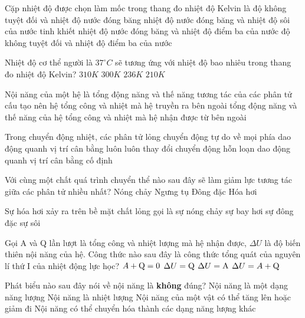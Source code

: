 \begin{ex}
Cặp nhiệt độ được chọn làm mốc trong thang đo nhiệt độ Kelvin là
\choice
{độ không tuyệt đối và nhiệt độ nước đóng băng}
{nhiệt độ nước đóng băng và nhiệt độ sôi của nước tinh khiết}
{nhiệt độ nước đóng băng và nhiệt độ điểm ba của nước}
{\True độ không tuyệt đối và nhiệt độ điểm ba của nước}
\loigiai{}
\end{ex}
\begin{ex}
Nhiệt độ cơ thể người là $37^\circ C$ sẽ tương ứng với nhiệt độ bao nhiêu trong thang đo nhiệt độ Kelvin?
\choice
{\True $310K$}
{$300K$}
{$236K$}
{$210K$}
\loigiai{}
\end{ex}
\begin{ex}
Nội năng của một hệ là
\choice
{\True tổng động năng và thế năng tương tác của các phân tử cấu tạo nên hệ}
{tổng công và nhiệt mà hệ truyền ra bên ngoài}
{tổng động năng và thế năng của hệ}
{tổng công và nhiệt mà hệ nhận được từ bên ngoài}
\loigiai{}
\end{ex}
\begin{ex}
Trong chuyển động nhiệt, các phân tử lỏng
\choice
{chuyển động tự do về mọi phía}
{\True dao động quanh vị trí cân bằng luôn luôn thay đổi}
{chuyển động hỗn loạn}
{dao động quanh vị trí cân bằng cố định}
\loigiai{}
\end{ex}
\begin{ex}
Với cùng một chất quá trình chuyển thể nào sau đây sẽ làm giảm lực tương tác giữa các phân tử nhiều nhất?
\choice
{Nóng chảy}
{Ngưng tụ}
{Đông đặc}
{\True Hóa hơi}
\loigiai{}
\end{ex}
\begin{ex}
Sự hóa hơi xảy ra trên bề mặt chất lỏng gọi là
\choice
{sự nóng chảy}
{\True sự bay hơi}
{sự đông đặc}
{sự sôi}
\loigiai{}
\end{ex}
\begin{ex}
Gọi A và Q lần lượt là tổng công và nhiệt lượng mà hệ nhận được, $\Delta U $ là độ biến thiên nội năng của hệ. Công thức nào sau đây là công thức tổng quát của nguyên lí thứ I của nhiệt động lực học?
\choice
{$A+\rm{Q}=\rm{0}{\rm}$}
{$\Delta U=\rm{Q}{\rm}$}
{$\Delta U=\rm{A}{\rm}$}
{\True $\Delta U=A+\rm{Q}{\rm}$}
\loigiai{}
\end{ex}
\begin{ex}
Phát biểu nào sau đây nói về nội năng là \textbf{không} đúng?
\choice
{Nội năng là một dạng năng lượng}
{\True Nội năng là nhiệt lượng}
{Nội năng của một vật có thể tăng lên hoặc giảm đi}
{Nội năng có thể chuyển hóa thành các dạng năng lượng khác}
\loigiai{}
\end{ex}
